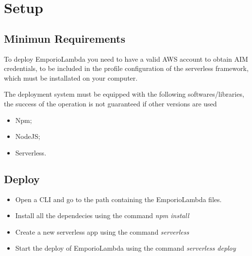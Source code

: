 \section{Setup}

\subsection{Minimun Requirements}
To deploy EmporioLambda you need to have a valid AWS account to obtain AIM credentials, to be included in the profile configuration of 
the serverless framework, which must be installated on your computer.

The deployment system must be equipped with the following softwares/libraries, the success of the operation is not guaranteed if other versions are used


\begin{itemize}
    \item Npm;
    \item NodeJS;
    \item Serverless.
\end{itemize}

\subsection{Deploy}

\begin{itemize}
    \item Open a CLI and go to the path containing the EmporioLambda files.
    \item Install all the dependecies using the command \textit{npm install}
    \item Create a new serverless app using the command \textit{serverless}
    \item Start the deploy of EmporioLambda using the command \textit{serverless deploy}
\end{itemize}